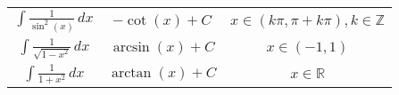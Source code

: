 \begin{minipage}{\linewidth}
\begin{tabular}{|c|c|c|}
        \(\displaystyle\int \frac{1}{\sin^2(x)} \,dx\)    & \(-\cot(x) + C\)                                   & \(x\in\left( k\pi, \pi + k\pi \right), k\in\mathbb{Z}\)                            \\
        \(\displaystyle\int \frac{1}{\sqrt{1-x^2}} \,dx\) & \(\arcsin(x) + C\)                                 & \(x\in(-1,1)\)                                                                     \\
        \(\displaystyle\int \frac{1}{1+x^2} \,dx\)        & \(\arctan(x) + C\)                                 & \(x\in\mathds{R}\)                                                                 \\
        \hline
    \end{tabular}

\end{minipage}

\vspace{1em}

